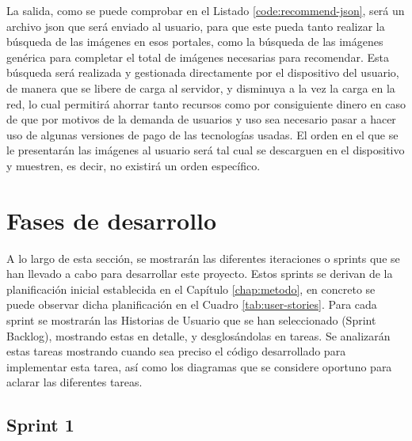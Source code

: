 La salida, como se puede comprobar en el Listado \ref{code:recommend-json}, será un archivo json que será enviado al usuario, para que este pueda tanto realizar la búsqueda de las imágenes en esos portales, como la búsqueda de las imágenes genérica para completar el total de imágenes necesarias para recomendar. Esta búsqueda será realizada y gestionada directamente por el dispositivo del usuario, de manera que se libere de carga al servidor, y disminuya a la vez la carga en la red, lo cual permitirá ahorrar tanto recursos como por consiguiente dinero en caso de que por motivos de la demanda de usuarios y uso sea necesario pasar a hacer uso de algunas versiones de pago de las tecnologías usadas. El orden en el que se le presentarán las imágenes al usuario será tal cual se descarguen en el dispositivo y muestren, es decir, no existirá un orden específico.\\




























\section{Fases de desarrollo}

A lo largo de esta sección, se mostrarán las diferentes iteraciones o sprints que se han llevado a cabo para desarrollar este proyecto. Estos sprints se derivan de la planificación inicial establecida en el Capítulo \ref{chap:metodo}, en concreto se puede observar dicha planificación en el Cuadro \ref{tab:user-stories}. Para cada sprint se mostrarán las Historias de Usuario que se han seleccionado (Sprint Backlog), mostrando estas en detalle, y desglosándolas en tareas. Se analizarán estas tareas mostrando cuando sea preciso el código desarrollado para implementar esta tarea, así como los diagramas que se considere oportuno para aclarar las diferentes tareas.

\subsection{Sprint 1}

